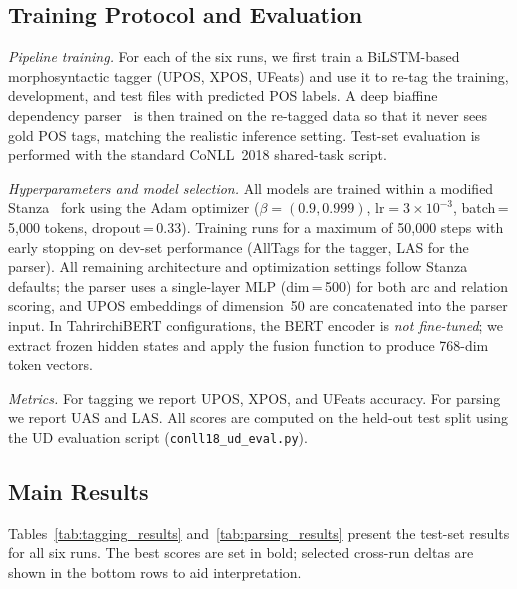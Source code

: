 \documentclass[runningheads]{llncs}
\begin{document}
\subsection{Training Protocol and Evaluation}
\label{sec:training_eval}

\textit{Pipeline training.}
For each of the six runs, we first train a BiLSTM-based morphosyntactic tagger (UPOS, XPOS, UFeats) and use it to re-tag the training, development, and test files with predicted POS labels.
A deep biaffine dependency parser~\cite{DBLP:conf/iclr/DozatM17} is then trained on the re-tagged data so that it never sees gold POS tags, matching the realistic inference setting.
Test-set evaluation is performed with the standard CoNLL~2018 shared-task script.

\textit{Hyperparameters and model selection.}
All models are trained within a modified Stanza~\cite{qi-etal-2020-stanza} fork using the Adam optimizer ($\beta=(0.9,0.999)$, $\text{lr}=3\!\times\!10^{-3}$, batch\,=\,5{,}000 tokens, dropout\,=\,0.33).
Training runs for a maximum of 50{,}000 steps with early stopping on dev-set performance (AllTags for the tagger, LAS for the parser).
All remaining architecture and optimization settings follow Stanza defaults; the parser uses a single-layer MLP (dim\,=\,500) for both arc and relation scoring, and UPOS embeddings of dimension~50 are concatenated into the parser input.
In TahrirchiBERT configurations, the BERT encoder is \emph{not fine-tuned}; we extract frozen hidden states and apply the fusion function to produce 768-dim token vectors.

\textit{Metrics.}
For tagging we report UPOS, XPOS, and UFeats accuracy.
For parsing we report UAS and LAS.
All scores are computed on the held-out test split using the UD evaluation script (\texttt{conll18\_ud\_eval.py}).

\subsection{Main Results}
\label{sec:main_results}

Tables~\ref{tab:tagging_results} and~\ref{tab:parsing_results} present the test-set results for all six runs.
The best scores are set in bold; selected cross-run deltas are shown in the bottom rows to aid interpretation.
\end{document}

